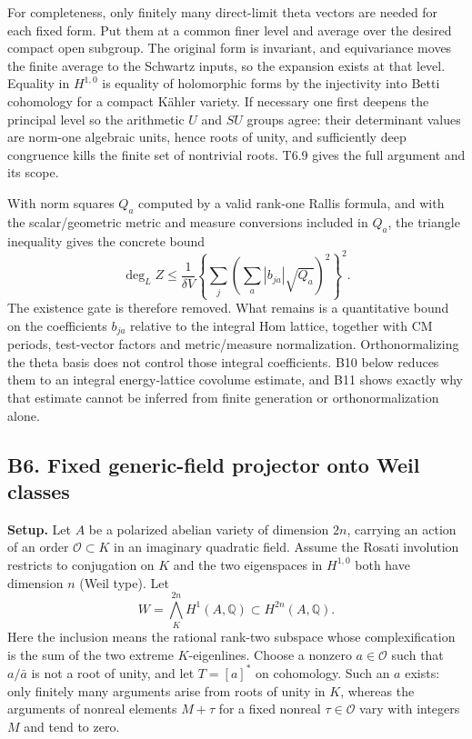 \documentclass[11pt,a4paper]{article}
\theoremstyle{definition}
\begin{document}
For completeness, only finitely many direct-limit theta vectors are needed for each fixed form. Put them at a common finer level and average over the desired compact open subgroup. The original form is invariant, and equivariance moves the finite average to the Schwartz inputs, so the expansion exists at that level. Equality in \(H^{1,0}\) is equality of holomorphic forms by the injectivity into Betti cohomology for a compact Kähler variety. If necessary one first deepens the principal level so the arithmetic \(U\) and \(SU\) groups agree: their determinant values are norm-one algebraic units, hence roots of unity, and sufficiently deep congruence kills the finite set of nontrivial roots. T6.9 gives the full argument and its scope.

With norm squares \(Q_a\) computed by a valid rank-one Rallis formula, and with the scalar/geometric metric and measure conversions included in \(Q_a\), the triangle inequality gives the concrete bound \[
 \deg_L Z\leq\frac{1}{\delta V}
 \left\{\sum_j\left(\sum_a|b_{ja}|\sqrt{Q_a}\right)^2\right\}^2.
\] The existence gate is therefore removed. What remains is a quantitative bound on the coefficients \(b_{ja}\) relative to the integral Hom lattice, together with CM periods, test-vector factors and metric/measure normalization. Orthonormalizing the theta basis does not control those integral coefficients. B10 below reduces them to an integral energy-lattice covolume estimate, and B11 shows exactly why that estimate cannot be inferred from finite generation or orthonormalization alone.

\subsection{B6. Fixed generic-field projector onto Weil classes}\label{b6.-fixed-generic-field-projector-onto-weil-classes}

\textbf{Setup.} Let \(A\) be a polarized abelian variety of dimension \(2n\), carrying an action of an order \(\mathcal O\subset K\) in an imaginary quadratic field. Assume the Rosati involution restricts to conjugation on \(K\) and the two eigenspaces in \(H^{1,0}\) both have dimension \(n\) (Weil type). Let \[
 W=\bigwedge_K^{2n}H^1(A,\mathbb Q)\subset H^{2n}(A,\mathbb Q).
\] Here the inclusion means the rational rank-two subspace whose complexification is the sum of the two extreme \(K\)-eigenlines. Choose a nonzero \(a\in\mathcal O\) such that \(a/\bar a\) is not a root of unity, and let \(T=[a]^*\) on cohomology. Such an \(a\) exists: only finitely many arguments arise from roots of unity in \(K\), whereas the arguments of nonreal elements \(M+\tau\) for a fixed nonreal \(\tau\in\mathcal O\) vary with integers \(M\) and tend to zero.
\end{document}
